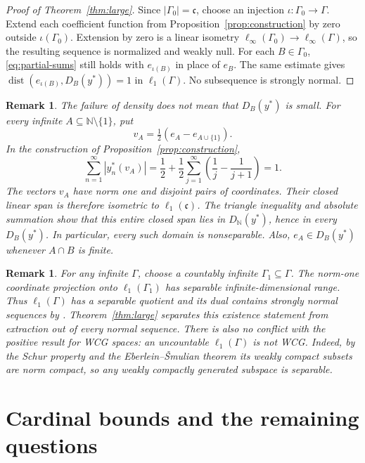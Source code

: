 \documentclass[10pt,a4paper]{amsart}
\newtheorem{remark}[theorem]{Remark}
\newcommand{\N}{\mathbb N}
\newcommand{\cfrak}{\mathfrak c}
\DeclareMathOperator{\dist}{dist}
\begin{document}
\begin{proof}[Proof of Theorem~\ref{thm:large}]
Since $|\Gamma_0|=\cfrak$, choose an injection
$\iota:\Gamma_0\to\Gamma$. Extend each coefficient function from
Proposition~\ref{prop:construction} by zero outside $\iota(\Gamma_0)$.
Extension by zero is a linear isometry
$\ell_\infty(\Gamma_0)\to\ell_\infty(\Gamma)$, so the resulting
sequence is normalized and weakly null. For each $B\in\Gamma_0$,
\eqref{eq:partial-sums} still holds with $e_{\iota(B)}$ in place of
$e_B$. The same estimate gives
$\dist(e_{\iota(B)},D_B(y^*))=1$ in $\ell_1(\Gamma)$.
No subsequence is strongly normal.
\end{proof}

\begin{remark}\label{rem:domains}
The failure of density does not mean that $D_B(y^*)$ is small.
For every infinite $A\subseteq\N\setminus\{1\}$, put
\[
 v_A=\tfrac12(e_A-e_{A\cup\{1\}}).
\]
In the construction of Proposition~\ref{prop:construction},
\[
 \sum_{n=1}^{\infty}|y_n^*(v_A)|
 =\frac12+\frac12\sum_{j=1}^{\infty}
                  \left(\frac1j-\frac1{j+1}\right)=1.
\]
The vectors $v_A$ have norm one and disjoint pairs of coordinates.
Their closed linear span is therefore isometric to $\ell_1(\cfrak)$.
The triangle inequality and absolute summation show that this entire
closed span lies in $D_{\N}(y^*)$, hence in every $D_B(y^*)$.
In particular, every such domain is nonseparable. Also,
$e_A\in D_B(y^*)$ whenever $A\cap B$ is finite.
\end{remark}

\begin{remark}\label{rem:context}
For any infinite $\Gamma$, choose a countably infinite
$\Gamma_1\subseteq\Gamma$. The norm-one coordinate projection onto
$\ell_1(\Gamma_1)$ has separable infinite-dimensional range. Thus
$\ell_1(\Gamma)$ has a separable quotient and its dual contains
strongly normal sequences by \cite[Theorem~3]{Sliwa}. Theorem~\ref{thm:large}
separates this existence statement from extraction out of every normal
sequence. There is also no conflict with the positive result for WCG
spaces: an uncountable $\ell_1(\Gamma)$ is not WCG. Indeed, by the
Schur property and the Eberlein--\v{S}mulian theorem its weakly compact
subsets are norm compact, so any weakly compactly generated subspace
is separable.
\end{remark}

\section{Cardinal bounds and the remaining questions}\label{sec:density}
\end{document}
